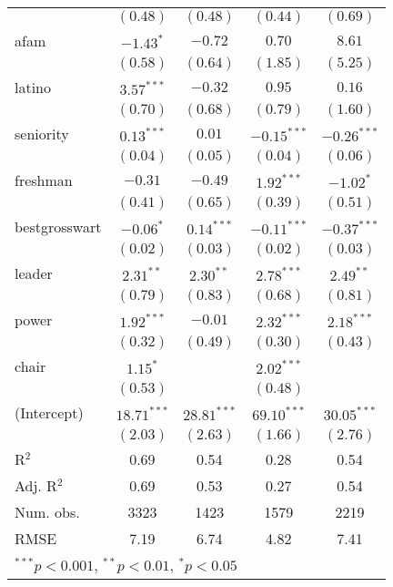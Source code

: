 \documentclass[12pt]{article}
\begin{document}
\begin{table}[H]
\begin{center}
\begin{tabular}{l c c c c }
			& $(0.48)$      & $(0.48)$      & $(0.44)$      & $(0.69)$      \\
			afam                   & $-1.43^{*}$   & $-0.72$       & $0.70$        & $8.61$        \\
			& $(0.58)$      & $(0.64)$      & $(1.85)$      & $(5.25)$      \\
			latino                 & $3.57^{***}$  & $-0.32$       & $0.95$        & $0.16$        \\
			& $(0.70)$      & $(0.68)$      & $(0.79)$      & $(1.60)$      \\
			seniority              & $0.13^{***}$  & $0.01$        & $-0.15^{***}$ & $-0.26^{***}$ \\
			& $(0.04)$      & $(0.05)$      & $(0.04)$      & $(0.06)$      \\
			freshman               & $-0.31$       & $-0.49$       & $1.92^{***}$  & $-1.02^{*}$   \\
			& $(0.41)$      & $(0.65)$      & $(0.39)$      & $(0.51)$      \\
			bestgrosswart          & $-0.06^{*}$   & $0.14^{***}$  & $-0.11^{***}$ & $-0.37^{***}$ \\
			& $(0.02)$      & $(0.03)$      & $(0.02)$      & $(0.03)$      \\
			leader                 & $2.31^{**}$   & $2.30^{**}$   & $2.78^{***}$  & $2.49^{**}$   \\
			& $(0.79)$      & $(0.83)$      & $(0.68)$      & $(0.81)$      \\
			power                  & $1.92^{***}$  & $-0.01$       & $2.32^{***}$  & $2.18^{***}$  \\
			& $(0.32)$      & $(0.49)$      & $(0.30)$      & $(0.43)$      \\
			chair                  & $1.15^{*}$    &               & $2.02^{***}$  &               \\
			& $(0.53)$      &               & $(0.48)$      &               \\
			(Intercept)            & $18.71^{***}$ & $28.81^{***}$ & $69.10^{***}$ & $30.05^{***}$ \\
			& $(2.03)$      & $(2.63)$      & $(1.66)$      & $(2.76)$      \\
			\hline
			R$^2$                  & 0.69          & 0.54          & 0.28          & 0.54          \\
			Adj. R$^2$             & 0.69          & 0.53          & 0.27          & 0.54          \\
			Num. obs.              & 3323          & 1423          & 1579          & 2219          \\
			RMSE                   & 7.19          & 6.74          & 4.82          & 7.41          \\
			\hline
			\multicolumn{5}{l}{\scriptsize{$^{***}p<0.001$, $^{**}p<0.01$, $^*p<0.05$}}
		\end{tabular}
	\end{center}
\end{table}
\end{document}
